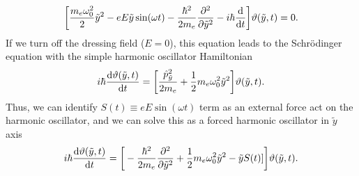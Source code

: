 \begin{equation} \label{eq_a6}
    \bigg[
    \frac{m_e \omega_0^2}{2}\tilde{y}^2
    - {eE\tilde{y}}\sin(\omega t)
    -
    \frac{\hbar^2}{2m_e}
    \pdv[2]{\tilde{y}}
    - i \hbar \dv{t}
    \bigg]
    \vartheta(\tilde{y},t) = 0.
\end{equation}
If we turn off the dressing field ($E=0$), this equation leads to the Schrödinger equation with the simple harmonic oscillator Hamiltonian
\begin{equation} \label{eq_a7}
     i \hbar \dv{\vartheta(\tilde{y},t)}{t} =
    \bigg[
    \frac{\hat{p}_{\tilde{y}}^2}{2m_e} +
    \frac{1}{2}m_e \omega_0^2\tilde{y}^2
    \bigg]
    \vartheta(\tilde{y},t).
\end{equation}
Thus, we can identify $S(t) \equiv eE\sin(\omega t)$ term as an external force act on the harmonic oscillator, and we can solve this as a forced harmonic oscillator in $\tilde{y}$ axis
\begin{equation} \label{eq_a8}
  \begin{aligned}
    i \hbar \dv{\vartheta(\tilde{y},t)}{t} =
    \bigg[
    -
    \frac{\hbar^2}{2m_e}
    \pdv[2]{\tilde{y}} +
    \frac{1}{2}m_e \omega_0^2\tilde{y}^2
    - \tilde{y}S(t)]
    \bigg]
    \vartheta(\tilde{y},t).
  \end{aligned}
\end{equation}

